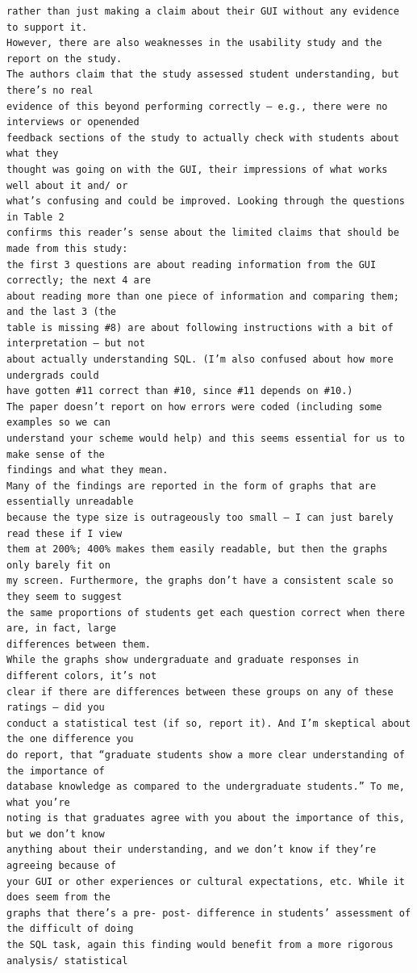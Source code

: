 \documentclass[11pt]{tise_style}
\begin{document}
\begin{verbatim}
rather than just making a claim about their GUI without any evidence to support it.
However, there are also weaknesses in the usability study and the report on the study.
The authors claim that the study assessed student understanding, but there’s no real
evidence of this beyond performing correctly – e.g., there were no interviews or openended
feedback sections of the study to actually check with students about what they
thought was going on with the GUI, their impressions of what works well about it and/ or
what’s confusing and could be improved. Looking through the questions in Table 2
confirms this reader’s sense about the limited claims that should be made from this study:
the first 3 questions are about reading information from the GUI correctly; the next 4 are
about reading more than one piece of information and comparing them; and the last 3 (the
table is missing #8) are about following instructions with a bit of interpretation – but not
about actually understanding SQL. (I’m also confused about how more undergrads could
have gotten #11 correct than #10, since #11 depends on #10.)
The paper doesn’t report on how errors were coded (including some examples so we can
understand your scheme would help) and this seems essential for us to make sense of the
findings and what they mean.
Many of the findings are reported in the form of graphs that are essentially unreadable
because the type size is outrageously too small — I can just barely read these if I view
them at 200%; 400% makes them easily readable, but then the graphs only barely fit on
my screen. Furthermore, the graphs don’t have a consistent scale so they seem to suggest
the same proportions of students get each question correct when there are, in fact, large
differences between them.
While the graphs show undergraduate and graduate responses in different colors, it’s not
clear if there are differences between these groups on any of these ratings – did you
conduct a statistical test (if so, report it). And I’m skeptical about the one difference you
do report, that “graduate students show a more clear understanding of the importance of
database knowledge as compared to the undergraduate students.” To me, what you’re
noting is that graduates agree with you about the importance of this, but we don’t know
anything about their understanding, and we don’t know if they’re agreeing because of
your GUI or other experiences or cultural expectations, etc. While it does seem from the
graphs that there’s a pre- post- difference in students’ assessment of the difficult of doing
the SQL task, again this finding would benefit from a more rigorous analysis/ statistical

\end{verbatim}
\end{document}
